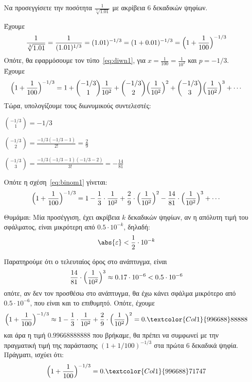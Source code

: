 \documentclass[a4paper,table]{report}
\begin{document}
\begin{mybox3}
  \begin{example}
    Να προσεγγίσετε την ποσότητα $ \frac{1}{\sqrt[3]{1.01}} $ με ακρίβεια 6 δεκαδικών
    ψηφίων.
  \end{example}
\end{mybox3}
\begin{solution}
  Έχουμε 
  \[
    \frac{1}{\sqrt[3]{1.01}} = \frac{1}{(1.01)^{1/3}} = (1.01)^{-1/3} = (1+0.01)^{-1/3} =
    \Bigl(1+ \frac{1}{100} \Bigr)^{-1/3}
  \] 
  Οπότε, θα εφαρμόσουμε τον τύπο~\eqref{eq:diwn1}, για $ x= \frac{1}{100} =
  \frac{1}{10^{2}} $ και $ p=-1/3 $. Έχουμε
  \begin{equation}\label{eq:binom1}
    \Bigl(1+ \frac{1}{100} \Bigr)^{-1/3} = 1 +  \binom{-1/3}{1} \frac{1}{10^{2}} +
    \binom{-1/3}{2} \Bigl(\frac{1}{10^{2}}\Bigr)^{2} + \binom{-1/3}{3}
    \Bigl(\frac{1}{10^{2}} \Bigr)^{3} + \cdots
  \end{equation} 
  Τώρα, υπολογίζουμε τους διωνυμικούς συντελεστές:
  \begin{myitemize}
    \item $ \binom{-1/3}{1} = -1/3 $
    \item $ \binom{-1/3}{2} = \frac{-1/3(-1/3 -1)}{2!} = \frac{2}{9} $
    \item $ \binom{-1/3}{3} = \frac{-1/3(-1/3 -1)(-1/3 - 2)}{3!} =-\frac{14}{81} $ 
  \end{myitemize}
  Οπότε η σχέση~\eqref{eq:binom1} γίνεται:
  \begin{equation}
    \Bigl(1+ \frac{1}{100} \Bigr)^{-1/3} = 1 - \frac{1}{3} \cdot \frac{1}{10^{2}} +
    \frac{2}{9} \cdot \Bigl(\frac{1}{10^{2}}\Bigr)^{2} - \frac{14}{81} \cdot
    \Bigl(\frac{1}{10^{2}} \Bigr)^{3} + \cdots
  \end{equation}
  \begin{mybox1}
  \item {}
    \textcolor{Col1}{Θυμάμαι:} Μία προσέγγιση, έχει ακρίβεια $k$ δεκαδικών ψηφίων, αν 
    η απόλυτη τιμή του σφάλματος, είναι μικρότερη από $ 0.5 \cdot 10^{-k} $, δηλαδή:
    \[
      \abs{\varepsilon} < \frac{1}{2} \cdot 10^{-k} 
    \]
  \end{mybox1}
  Παρατηρούμε ότι ο τελευταίος όρος στο ανάπτυγμα, είναι 
  \[
    \frac{14}{81} \cdot \Bigl(\frac{1}{10^{2}} \Bigr)^{3} \approx 0.17 \cdot 10^{-6} < 0.5 \cdot
    10^{-6}
  \] 
  οπότε, αν δεν τον προσθέσω στο ανάπτυγμα, θα έχω κάνει σφάλμα μικρότερο από $ 0.5
  \cdot 10^{-6} $, που είναι και το επιθυμητό.
  Οπότε, έχουμε
  \[
    \Bigl(1+ \frac{1}{100} \Bigr)^{-1/3} \approx 1 - \frac{1}{3} \cdot \frac{1}{10^{2}} +
    \frac{2}{9} \cdot \Bigl(\frac{1}{10^{2}}\Bigr)^{2} = 0.\textcolor{Col1}{996688}88888
  \]
  και άρα η τιμή $ 0.99668888888 $ που βρήκαμε, θα πρέπει να συμφωνεί με την 
  πραγματική τιμή της παράστασης $(1+ 1/{100})^{-1/3} $ στα πρώτα 6 
  δεκαδικά ψηφία. Πράγματι, ισχύει ότι:
  \[
    \Bigl(1+ \frac{1}{100} \Bigr)^{-1/3} = 0.\textcolor{Col1}{996688}71747
  \] 
\end{solution}
\end{document}
